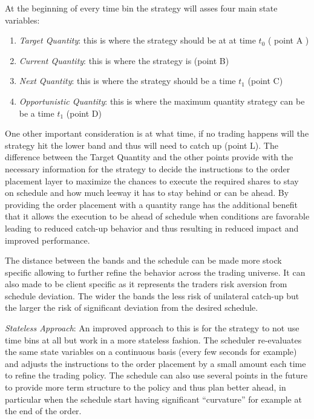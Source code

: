 At the beginning of every time bin the strategy will  asses four main state variables:


\begin{enumerate}
\item\emph{Target Quantity}: this is where the strategy should be at at time $t_0$ ( point A )
\item\emph{ Current Quantity}: this is where the strategy is (point B)
\item\emph{ Next Quantity}: this is where the strategy should be a time $t_1$ (point C)
\item\emph{ Opportunistic Quantity}: this is where the maximum quantity strategy can be be a time $t_1$ (point D)
\end{enumerate}


One other important consideration is at what time, if no trading happens will the strategy hit the lower band and thus will need to catch up (point L). The difference between the Target Quantity and the other points provide with the necessary  information for the strategy to decide the instructions to the order placement layer to maximize the chances to execute the required shares to stay on schedule and how much leeway it has to stay behind or can be ahead. By providing the order placement with a quantity range has the additional benefit that it allows the execution to be ahead of schedule when conditions are favorable leading to reduced catch-up behavior and thus resulting in reduced impact and improved performance.


The distance between the bands and the schedule can be made more stock specific allowing to further refine the behavior across the trading universe. It can also made to be client specific as it represents the traders risk aversion from schedule deviation. The wider the bands the less risk of unilateral catch-up but the larger the risk of significant deviation from the desired schedule. \twomedskip


\noindent\emph{Stateless Approach}: An improved approach to this is for the strategy to not use time bins at all but work in a more stateless fashion. The scheduler re-evaluates the same state variables on a continuous basis (every few seconds for example) and adjusts the instructions to the order placement by a small amount each time to refine the trading policy. The schedule can also use several points in the future to provide more term structure to the policy and thus plan better ahead, in particular when the schedule start having significant ``curvature'' for example at the end of the order. \twomedskip


